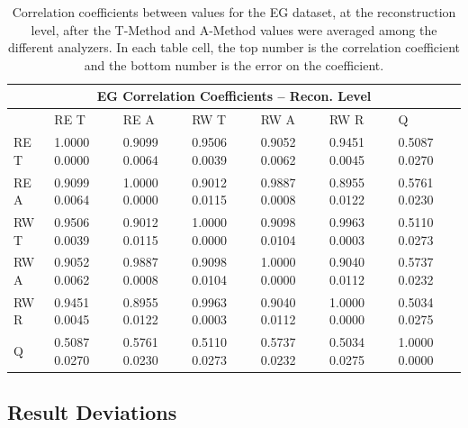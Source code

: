 \begin{table}[b]
\setlength\tabcolsep{15pt}
\footnotesize
\centering
\renewcommand{\arraystretch}{1.4}
\begin{tabularx}{0.8\linewidth}{@{\extracolsep{\fill}}lXXXXXX}
  \toprule
  	\multicolumn{7}{c}{{\normalsize EG Correlation Coefficients -- Recon. Level}} \\
  \midrule
  	       & RE T & RE A & RW T & RW A & RW R & \quad Q \\
  \midrule
	RE T   & 1.0000 0.0000 & 0.9099 0.0064 & 0.9506 0.0039 & 0.9052 0.0062 & 0.9451 0.0045 & 0.5087 0.0270  \\
	RE A   & 0.9099 0.0064 & 1.0000 0.0000 & 0.9012 0.0115 & 0.9887 0.0008 & 0.8955 0.0122 & 0.5761 0.0230  \\
	RW T   & 0.9506 0.0039 & 0.9012 0.0115 & 1.0000 0.0000 & 0.9098 0.0104 & 0.9963 0.0003 & 0.5110 0.0273  \\
	RW A   & 0.9052 0.0062 & 0.9887 0.0008 & 0.9098 0.0104 & 1.0000 0.0000 & 0.9040 0.0112 & 0.5737 0.0232  \\
	RW R   & 0.9451 0.0045 & 0.8955 0.0122 & 0.9963 0.0003 & 0.9040 0.0112 & 1.0000 0.0000 & 0.5034 0.0275  \\
	Q      & 0.5087 0.0270 & 0.5761 0.0230 & 0.5110 0.0273 & 0.5737 0.0232 & 0.5034 0.0275 & 1.0000 0.0000  \\
  \bottomrule
\end{tabularx}
\caption[]{Correlation coefficients between \R values for the EG dataset, at the reconstruction level, after the \RW T-Method and A-Method \R values were averaged among the different analyzers. In each table cell, the top number is the correlation coefficient and the bottom number is the error on the coefficient.}
\label{tab:Corrs_EG_recon}
\end{table}




\clearpage
\subsection{Result Deviations}


